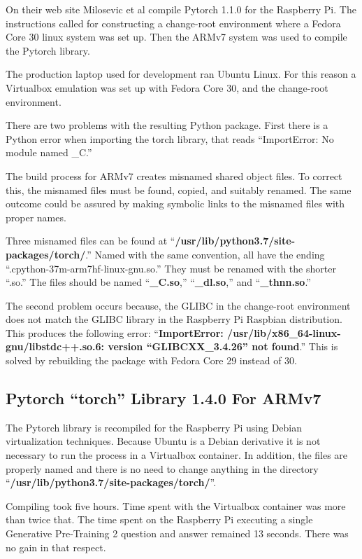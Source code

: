 On their web site Milosevic et al \cite{2018Milosevic} compile Pytorch 1.1.0 for the Raspberry Pi. The instructions called for constructing a change-root environment where a Fedora Core 30 linux system was set up. Then the ARMv7 system was used to compile the Pytorch library. %

The production laptop used for development ran Ubuntu Linux. For this reason a Virtualbox emulation was set up with Fedora Core 30, and the change-root environment.%

There are two problems with the resulting Python package. First there is a Python error when importing the torch library, that reads ``ImportError: No module named \_C.'' 

The build process for ARMv7 creates misnamed shared object files. To correct this, the misnamed files must be found, copied, and suitably renamed. The same outcome could be assured by making symbolic links to the misnamed files with proper names.

Three misnamed files can be found at ``\textbf{/usr/lib/python3.7/site-packages/torch/}.'' Named with the same convention, all have the ending ``.cpython-37m-arm7hf-linux-gnu.so.'' They must be renamed with the shorter ``.so.'' The files should be named ``\textbf{\_C.so},'' ``\textbf{\_dl.so},'' and ``\textbf{\_thnn.so}.''

The second problem occurs because, the GLIBC in the change-root environment does not match the GLIBC library in the Raspberry Pi Raspbian distribution. This produces the following error: ``\textbf{ImportError: /usr/lib/x86\_64-linux-gnu/libstdc++.so.6: version ``GLIBCXX\_3.4.26'' not found}.'' This is solved by rebuilding the package with Fedora Core 29 instead of 30. 
 
\subsection{Pytorch ``torch'' Library 1.4.0 For ARMv7}
The Pytorch library is recompiled for the Raspberry Pi using Debian virtualization techniques. Because Ubuntu is a Debian derivative it is not necessary to run the process in a Virtualbox container. In addition, the files are properly named and there is no need to change anything in the directory ``\textbf{/usr/lib/python3.7/site-packages/torch/}''. 

Compiling took five hours. Time spent with the Virtualbox container was more than twice that. The time spent on the Raspberry Pi executing a single Generative Pre-Training 2 question and answer remained 13 seconds. There was no gain in that respect.

